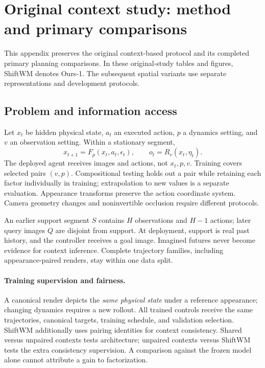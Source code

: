 \section{Original context study: method and primary comparisons}
\label{app:original-context-study}
This appendix preserves the original context-based protocol and its completed primary planning comparisons. In these original-study tables and figures, ShiftWM denotes Ours-1. The subsequent spatial variants use separate representations and development protocols.

\subsection{Problem and information access}
\label{sec:problem}
Let $x_t$ be hidden physical state, $a_t$ an executed action, $p$ a dynamics
setting, and $v$ an observation setting. Within a stationary segment,
\begin{equation}
 x_{t+1}=F_p(x_t,a_t,\epsilon_t),\qquad o_t=R_v(x_t,\eta_t).
 \label{eq:environment}
\end{equation}
The deployed agent receives images and actions, not $x_t,p,v$.
Training covers selected pairs $(v,p)$. Compositional testing holds out a
pair while retaining each factor individually in training; extrapolation
to new values is a separate evaluation. Appearance transforms preserve the
action coordinate system. Camera geometry changes and noninvertible
occlusion require different protocols.

An earlier support segment $S$ contains $H$ observations and $H-1$ actions;
later query images $Q$ are disjoint from support. At deployment, support
is real past history, and the controller receives a goal image. Imagined
futures never become evidence for context inference. Complete trajectory
families, including appearance-paired renders, stay within one data split.

\paragraph{Training supervision and fairness.}
A canonical render depicts the \emph{same physical state} under a reference
appearance; changing dynamics requires a new rollout. All trained controls
receive the same trajectories, canonical targets, training schedule, and
validation selection. ShiftWM additionally uses pairing identities for
context consistency. Shared versus unpaired contexts tests architecture;
unpaired contexts versus ShiftWM tests the extra consistency supervision.
A comparison against the frozen model alone cannot attribute a gain to
factorization.

